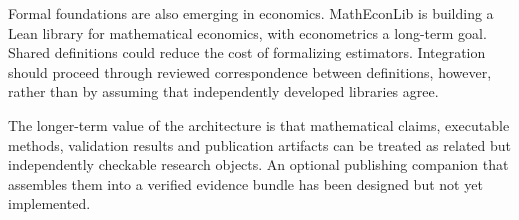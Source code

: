 Formal foundations are also emerging in economics. MathEconLib
\citep{matheconlib-2026} is building a Lean library for mathematical economics,
with econometrics a long-term goal. Shared definitions could reduce the cost of
formalizing estimators. Integration should proceed through reviewed
correspondence between definitions, however, rather than by assuming that
independently developed libraries agree.

The longer-term value of the architecture is that mathematical claims,
executable methods, validation results and publication artifacts can be treated
as related but independently checkable research objects. An optional publishing
companion that assembles them into a verified evidence bundle has been designed
but not yet implemented.
